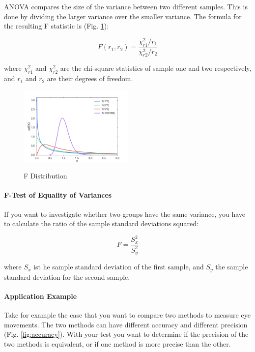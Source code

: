 ANOVA compares the size of the variance between two different samples. This is done by dividing the larger variance over the smaller variance. The formula for the resulting F statistic is (Fig. \ref{fig:Fdistribution}):

\begin{equation}
    F(r_1, r_2) = \frac{\chi_{r1} ^2 /r_1}{\chi_{r2} ^2 /r_2}
\end{equation}

where $\chi_{r1}^2$ and $\chi_{r2}^2$ are the chi-square statistics of sample one and two respectively, and $r_1$ and $r_2$ are their degrees of freedom.

\begin{figure}
  \centering
  \includegraphics[width=0.5\textwidth]{../Images/dist_f.png}\\
  \caption{F Distribution}
  \label{fig:Fdistribution}
\end{figure}


\paragraph{F-Test of Equality of Variances}
If you want to investigate whether two groups have the same variance, you have to calculate the ratio of the sample standard deviations squared:

\begin{equation}
  F = \frac{S_x^2}{S_y^2}
\end{equation}

where $S_x$ ist he sample standard deviation of the first sample, and $S_y$ the sample standard deviation for the second sample.

\paragraph{Application Example}

Take for example the case that you want to compare two methods to measure eye movements. The two methods
can have different accuracy and different precision (Fig. \ref{fig:accuracy}). With your test you want to
determine if the precision of the two methods is equivalent, or if one
method is more precise than the other.

